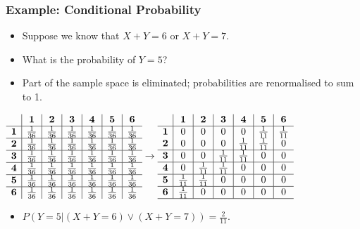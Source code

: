 \documentclass[xcolor=dvipsnames,ignorenonframetext]{beamer}
\begin{document}
\begin{frame}
  \frametitle{Example: Conditional Probability}
  \begin{itemize}
  \item Suppose we know that $X+Y=6$ or $X+Y=7$.
  \item What is the probability of $Y=5$?
  \item Part of the sample space is eliminated; probabilities are renormalised to sum to 1.
  \end{itemize}

  {\small{}
    $\begin{array}{r|c|c|c|c|c|c}
    & \textbf{1} & \textbf{2} & \textbf{3} & \textbf{4} & \textbf{5} & \textbf{6}\\\hline
    \textbf{1} & \frac{1}{36} & \frac{1}{36} & \frac{1}{36} & \frac{1}{36} & \frac{1}{36}& \frac{1}{36}\\\hline
    \textbf{2} & \frac{1}{36} & \frac{1}{36} & \frac{1}{36} & \frac{1}{36} & \frac{1}{36}& \frac{1}{36}\\\hline
    \textbf{3} & \frac{1}{36} & \frac{1}{36} & \frac{1}{36} & \frac{1}{36} & \frac{1}{36}& \frac{1}{36}\\\hline
    \textbf{4} & \frac{1}{36} & \frac{1}{36} & \frac{1}{36} & \frac{1}{36} & \frac{1}{36}& \frac{1}{36}\\\hline
    \textbf{5} & \frac{1}{36} & \frac{1}{36} & \frac{1}{36} & \frac{1}{36} & \frac{1}{36}& \frac{1}{36}\\\hline
    \textbf{6} & \frac{1}{36} & \frac{1}{36} & \frac{1}{36} & \frac{1}{36} & \frac{1}{36}& \frac{1}{36}\\
  \end{array}\rightarrow
  \begin{array}{r|c|c|c|c|c|c}
    & \textbf{1} & \textbf{2} & \textbf{3} & \textbf{4} & \textbf{5} & \textbf{6}\\\hline
    \textbf{1} & 0 & 0 & 0 & 0 & \frac{1}{11}& \frac{1}{11}\\
    \textbf{2} & 0 & 0 & 0 & \frac{1}{11} & \frac{1}{11}& 0\\\hline
    \textbf{3} & 0 & 0 & \frac{1}{11} & \frac{1}{11} & 0& 0\\\hline
    \textbf{4} & 0 & \frac{1}{11} & \frac{1}{11} & 0 & 0& 0\\\hline
    \textbf{5} & \frac{1}{11} & \frac{1}{11} & 0 & 0 & 0& 0\\\hline
    \textbf{6} & \frac{1}{11} & 0 & 0 & 0 & 0& 0\\\hline
  \end{array}$}
  \begin{itemize}
  \item $P(Y=5|(X+Y=6)\vee(X+Y=7))=\frac{2}{11}$.
  \end{itemize}
\end{frame}
\end{document}
